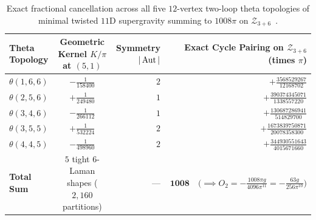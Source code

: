 \begin{table}[H]
\centering
\scriptsize
\setlength{\tabcolsep}{5pt}
\renewcommand{\arraystretch}{1.15}
\begin{tabular}{@{}lcrr@{}}
\toprule
\textbf{Theta Topology} & \textbf{Geometric Kernel $K/\pi$ at $(5,1)$} & \textbf{Symmetry $|\operatorname{Aut}|$} & \textbf{Exact Cycle Pairing on $\mathcal{Z}_{3+6}$ (times $\pi$)} \\
\midrule
$\theta(1,6,6)$ & $-\frac{1}{158400}$ & $2$ & $+\frac{3568529267}{12168702}$ \\
$\theta(2,5,6)$ & $+\frac{1}{249480}$ & $1$ & $+\frac{390374345071}{1338557220}$ \\
$\theta(3,4,6)$ & $-\frac{1}{266112}$ & $1$ & $+\frac{130687286941}{514829700}$ \\
$\theta(3,5,5)$ & $+\frac{1}{532224}$ & $2$ & $+\frac{1673839750871}{20078358300}$ \\
$\theta(4,4,5)$ & $-\frac{1}{498960}$ & $2$ & $+\frac{344930551643}{4015671660}$ \\
\midrule
\textbf{Total Sum} & $5$ tight $6$-Laman shapes ($2{,}160$ partitions) & --- & $\mathbf{1008}\quad\bigl(\implies O_2 = -\frac{1008\pi g}{4096\pi^{11}} = -\frac{63g}{256\pi^{10}}\bigr)$ \\
\bottomrule
\end{tabular}
\caption{Exact fractional cancellation across all five $12$-vertex two-loop theta topologies of minimal twisted $11\mathrm{D}$ supergravity summing to $1008\pi$ on $\mathcal{Z}_{3+6}$~\cite{Repo9e833c8}.}
\label{tab:11d-theta-pairings}
\end{table}

